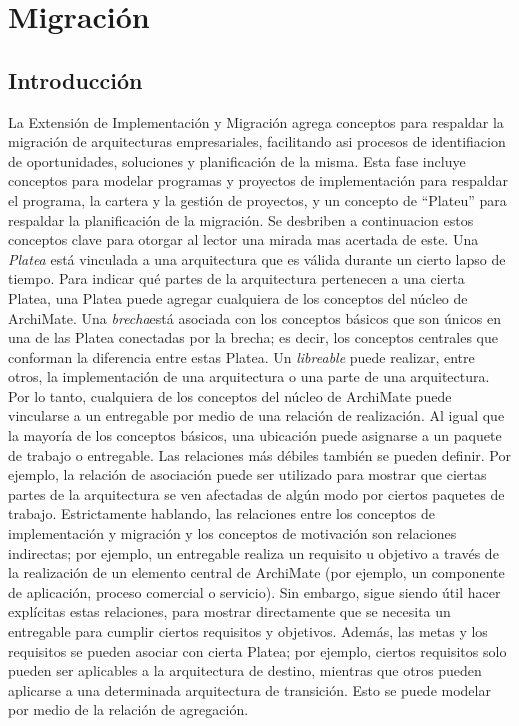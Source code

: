\chapter{Migración}


\section{Introducción}
La Extensión de Implementación y Migración agrega conceptos para respaldar la migración de arquitecturas empresariales, facilitando asi procesos de identifiacion de oportunidades, soluciones y planificación de la misma. Esta fase incluye conceptos para modelar programas y proyectos de implementación para respaldar el programa, la cartera y la gestión de proyectos, y un concepto de “Plateu” para respaldar la planificación de la migración. Se desbriben a continuacion estos conceptos clave para otorgar al lector una mirada mas acertada de este. 
Una \textit{Platea} está vinculada a una arquitectura que es válida durante un cierto lapso de tiempo. Para indicar qué partes de la arquitectura pertenecen a una cierta Platea, una Platea puede agregar cualquiera de los conceptos del núcleo de ArchiMate.
Una \textit{brecha}está asociada con los conceptos básicos que son únicos en una de las Platea conectadas por la brecha; es decir, los conceptos centrales que conforman la diferencia entre estas Platea.
Un \textit{libreable} puede realizar, entre otros, la implementación de una arquitectura o una parte de una arquitectura. Por lo tanto, cualquiera de los conceptos del núcleo de ArchiMate puede vincularse a un entregable por medio de una relación de realización. Al igual que la mayoría de los conceptos básicos, una ubicación puede asignarse a un paquete de trabajo o entregable. Las relaciones más débiles también se pueden definir. Por ejemplo, la relación de asociación puede ser
utilizado para mostrar que ciertas partes de la arquitectura se ven afectadas de algún modo por ciertos paquetes de trabajo.
Estrictamente hablando, las relaciones entre los conceptos de implementación y migración y los conceptos de motivación son relaciones indirectas; por ejemplo, un entregable realiza un requisito u objetivo a través de la realización de un elemento central de ArchiMate (por ejemplo, un componente de aplicación, proceso comercial o servicio). Sin embargo, sigue siendo útil hacer explícitas estas relaciones, para mostrar directamente que se necesita un entregable para cumplir ciertos requisitos y objetivos.
Además, las metas y los requisitos se pueden asociar con cierta Platea; por ejemplo, ciertos requisitos solo pueden ser aplicables a la arquitectura de destino, mientras que otros pueden aplicarse a una determinada arquitectura de transición. Esto se puede modelar por medio de la relación de agregación.


